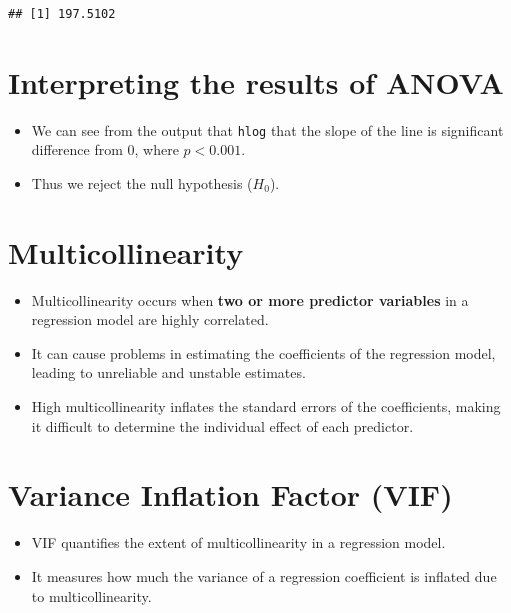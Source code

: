 \documentclass[
]{article}
\providecommand{\tightlist}{%
  \setlength{\itemsep}{0pt}\setlength{\parskip}{0pt}}
\begin{document}
\begin{verbatim}
## [1] 197.5102
\end{verbatim}

\hypertarget{interpreting-the-results-of-anova}{%
\section{Interpreting the results of
ANOVA}\label{interpreting-the-results-of-anova}}

\begin{itemize}
\tightlist
\item
  We can see from the output that \texttt{hlog} that the slope of the
  line is significant difference from 0, where \(p < 0.001\).
\item
  Thus we reject the null hypothesis (\(H_{0}\)).
\end{itemize}

\hypertarget{multicollinearity}{%
\section{Multicollinearity}\label{multicollinearity}}

\begin{itemize}
\tightlist
\item
  Multicollinearity occurs when \textbf{two or more predictor variables}
  in a regression model are highly correlated.
\item
  It can cause problems in estimating the coefficients of the regression
  model, leading to unreliable and unstable estimates.
\item
  High multicollinearity inflates the standard errors of the
  coefficients, making it difficult to determine the individual effect
  of each predictor.
\end{itemize}

\hypertarget{variance-inflation-factor-vif}{%
\section{Variance Inflation Factor
(VIF)}\label{variance-inflation-factor-vif}}

\begin{itemize}
\tightlist
\item
  VIF quantifies the extent of multicollinearity in a regression model.
\item
  It measures how much the variance of a regression coefficient is
  inflated due to multicollinearity.
\end{itemize}
\end{document}
